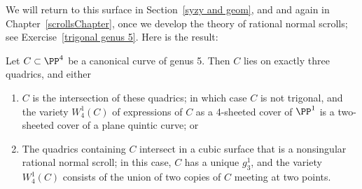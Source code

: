We will return to this surface in Section~\ref{syzy and geom}, and and again in Chapter~\ref{scrollsChapter}, once we develop the theory of rational normal scrolls; see Exercise~\ref{trigonal genus 5}.
Here is the result:

\begin{theorem}
Let $C \subset \PP^4$ be a canonical curve of genus 5. Then $C$ lies on exactly three quadrics, and either
\begin{enumerate}
\item $C$ is the intersection of these quadrics; in which case $C$ is not trigonal, and the variety $W^1_4(C)$ of expressions of $C$ as a 4-sheeted cover of $\PP^1$ is a two-sheeted cover of a plane quintic curve; or
\item The quadrics containing $C$ intersect in a cubic surface that is
a nonsingular rational normal scroll; in this case, $C$ has a unique $g^1_3$, and the variety $W^1_4(C)$ consists of the union of two copies of $C$ meeting at two points.
\end{enumerate}
\end{theorem}


